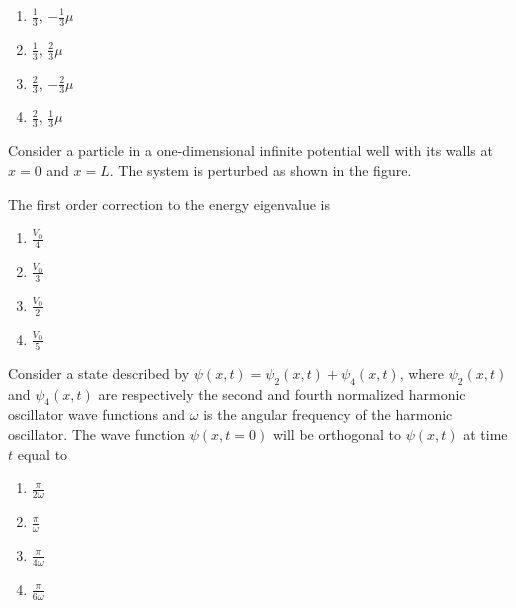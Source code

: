 \begin{enumerate}
\item $\frac{1}{3}$, $-\frac{1}{3}\mu$
\item $\frac{1}{3}$, $\frac{2}{3}\mu$
\item $\frac{2}{3}$, $-\frac{2}{3}\mu$
\item $\frac{2}{3}$, $\frac{1}{3}\mu$
\end{enumerate}

\item Consider a particle in a one-dimensional infinite potential well with its walls at $x=0$ and $x=L$. The system is perturbed as shown in the figure.


The first order correction to the energy eigenvalue is

\begin{enumerate}
\item $\frac{V_0}{4}$
\item $\frac{V_0}{3}$
\item $\frac{V_0}{2}$
\item $\frac{V_0}{5}$
\end{enumerate}

\item Consider a state described by $\psi(x,t)=\psi_2(x,t)+\psi_4(x,t)$, where $\psi_2(x,t)$ and $\psi_4(x,t)$ are respectively the second and fourth normalized harmonic oscillator wave functions and $\omega$ is the angular frequency of the harmonic oscillator. The wave function $\psi(x,t=0)$ will be orthogonal to $\psi(x,t)$ at time $t$ equal to

\begin{enumerate}
\item $\frac{\pi}{2\omega}$
\item $\frac{\pi}{\omega}$
\item $\frac{\pi}{4\omega}$
\item $\frac{\pi}{6\omega}$
\end{enumerate}

